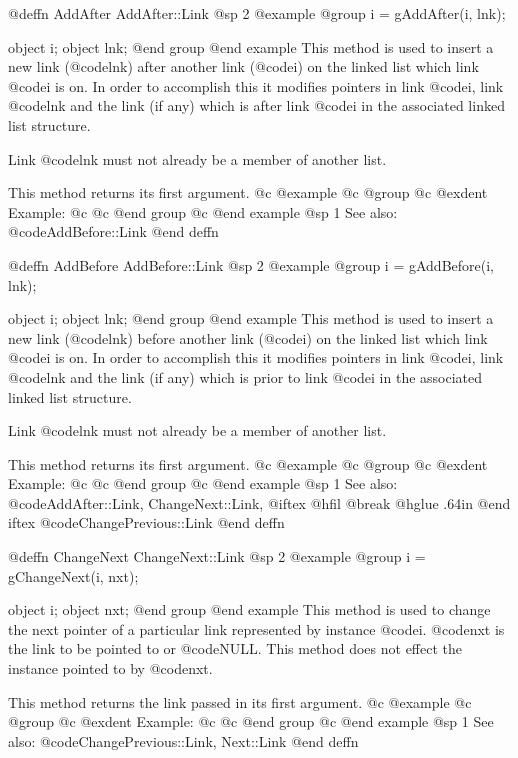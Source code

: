 @deffn {AddAfter} AddAfter::Link
@sp 2
@example
@group
i = gAddAfter(i, lnk);

object  i;
object  lnk;
@end group
@end example
This method is used to insert a new link (@code{lnk}) after another
link (@code{i}) on the linked list which link @code{i} is on.  In order
to accomplish this it modifies pointers in link @code{i}, link
@code{lnk} and the link (if any) which is after link @code{i} in
the associated linked list structure.

Link @code{lnk} must not already be a member of another list.

This method returns its first argument.
@c @example
@c @group
@c @exdent Example:
@c 
@c @end group
@c @end example
@sp 1
See also:  @code{AddBefore::Link}
@end deffn







@deffn {AddBefore} AddBefore::Link
@sp 2
@example
@group
i = gAddBefore(i, lnk);

object  i;
object  lnk;
@end group
@end example
This method is used to insert a new link (@code{lnk}) before another
link (@code{i}) on the linked list which link @code{i} is on.  In order
to accomplish this it modifies pointers in link @code{i}, link
@code{lnk} and the link (if any) which is prior to link @code{i} in
the associated linked list structure.

Link @code{lnk} must not already be a member of another list.

This method returns its first argument.
@c @example
@c @group
@c @exdent Example:
@c 
@c @end group
@c @end example
@sp 1
See also:  @code{AddAfter::Link, ChangeNext::Link,}
@iftex
@hfil @break @hglue .64in      
@end iftex
@code{ChangePrevious::Link}
@end deffn








@deffn {ChangeNext} ChangeNext::Link
@sp 2
@example
@group
i = gChangeNext(i, nxt);

object  i;
object  nxt;
@end group
@end example
This method is used to change the next pointer of a particular link
represented by instance @code{i}.  @code{nxt} is the link to be pointed
to or @code{NULL}.  This method does not effect the instance pointed to
by @code{nxt}.

This method returns the link passed in its first argument.
@c @example
@c @group
@c @exdent Example:
@c 
@c @end group
@c @end example
@sp 1
See also:  @code{ChangePrevious::Link, Next::Link}
@end deffn





